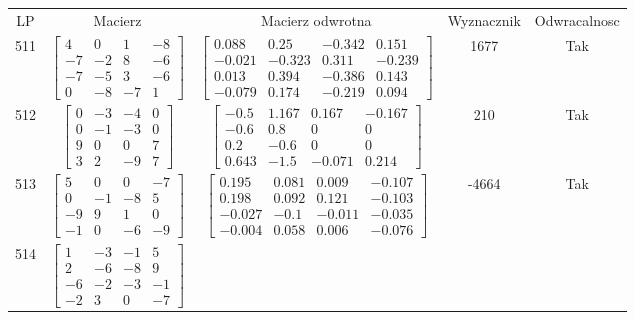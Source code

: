 \documentclass[a4paper,12pt]{article}
\begin{document}
\bgroup {} \vspace{0.2in} \begin{tabular}{c c c c c}
LP & Macierz & Macierz odwrotna & Wyznacznik & Odwracalnosc\\
511
&
$\begin{bmatrix} 4 & 0 & 1 & -8 \\ -7 & -2 & 8 & -6 \\ -7 & -5 & 3 & -6 \\ 0 & -8 & -7 & 1 \end{bmatrix}$
&
$\begin{bmatrix} 0.088 & 0.25 & -0.342 & 0.151 \\ -0.021 & -0.323 & 0.311 & -0.239 \\ 0.013 & 0.394 & -0.386 & 0.143 \\ -0.079 & 0.174 & -0.219 & 0.094 \end{bmatrix}$
&
1677
&
Tak
\\
512
&
$\begin{bmatrix} 0 & -3 & -4 & 0 \\ 0 & -1 & -3 & 0 \\ 9 & 0 & 0 & 7 \\ 3 & 2 & -9 & 7 \end{bmatrix}$
&
$\begin{bmatrix} -0.5 & 1.167 & 0.167 & -0.167 \\ -0.6 & 0.8 & 0 & 0 \\ 0.2 & -0.6 & 0 & 0 \\ 0.643 & -1.5 & -0.071 & 0.214 \end{bmatrix}$
&
210
&
Tak
\\
513
&
$\begin{bmatrix} 5 & 0 & 0 & -7 \\ 0 & -1 & -8 & 5 \\ -9 & 9 & 1 & 0 \\ -1 & 0 & -6 & -9 \end{bmatrix}$
&
$\begin{bmatrix} 0.195 & 0.081 & 0.009 & -0.107 \\ 0.198 & 0.092 & 0.121 & -0.103 \\ -0.027 & -0.1 & -0.011 & -0.035 \\ -0.004 & 0.058 & 0.006 & -0.076 \end{bmatrix}$
&
-4664
&
Tak
\\
514
&
$\begin{bmatrix} 1 & -3 & -1 & 5 \\ 2 & -6 & -8 & 9 \\ -6 & -2 & -3 & -1 \\ -2 & 3 & 0 & -7 \end{bmatrix}$

\end{tabular}
\end{document}
